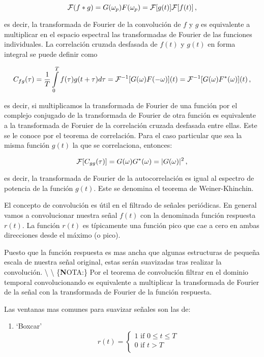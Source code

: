 \documentclass[
]{agujournal2019}
\providecommand{\tightlist}{%
  \setlength{\itemsep}{0pt}\setlength{\parskip}{0pt}}\usepackage{longtable,booktabs,array}
\begin{document}
\[{\cal F}(f*g)=G(\omega_p)F(\omega_p)={\cal F}[g(t)]{\cal F}[f(t)]\,,\]

es decir, la transformada de Fourier de la convolución de \(f\) y \(g\)
es equivalente a multiplicar en el espacio espectral las transformadas
de Fourier de las funciones individuales. La correlación cruzada
desfasada de \(f(t)\) y \(g(t)\) en forma integral se puede definir como

\[C_{fg}(\tau)=\frac{1}{T}\int\limits^{T}_{0} f(\tau) g(t+\tau) d\tau={\cal F}^{-1}[G(\omega)F(-\omega)](t)=
{\cal F}^{-1}[G(\omega)F^*(\omega)](t)\,,\]

es decir, si multiplicamos la transformada de Fourier de una función por
el complejo conjugado de la transformada de Fourier de otra función es
equivalente a la transformada de Foruier de la correlación cruzada
desfasada entre ellas. Este se le conoce por el teorema de correlación.
Para el caso particular que sea la misma función \(g(t)\) la que se
correlaciona, entonces:

\[{\cal F}[C_{gg}(\tau)]=G(\omega)G^*(\omega)=|G(\omega)|^2\,,\]

es decir, la transformada de Fourier de la autocorrelación es igual al
espectro de potencia de la función \(g(t)\). Este se denomina el teorema
de Weiner-Khinchin.

El concepto de convolución es útil en el filtrado de señales periódicas.
En general vamos a convolucionar nuestra señal \(f(t)\) con la
denominada función respuesta \(r(t)\). La función \(r(t)\) es
típicamente una función pico que cae a cero en ambas direcciones desde
el máximo (o pico).

\begin{center}
\end{center}

Puesto que la función respuesta es mas ancha que algunas estructuras de
pequeña escala de nuestra señal original, estas serán suavizadas tras
realizar la convolución. \textbackslash{} \textbackslash{}
\{\textbf NOTA:\} Por el teorema de convolución filtrar en el dominio
temporal convolucionando es equivalente a multiplicar la transformada de
Fourier de la señal con la transformada de Fourier de la función
respuesta.

Las ventanas mas comunes para suavizar señales son las de:~

\begin{enumerate}
\def\labelenumi{(\arabic{enumi})}
\tightlist
\item
  `Boxcar' \begin{equation*}
    r(t)=
    \left\lbrace
    \begin{array}{l}
  1 \text{ if } 0\le t\le T \\
  0 \text{ if } t>T \\
    \end{array}
    \right.
  \end{equation*}
\end{enumerate}
\end{document}
